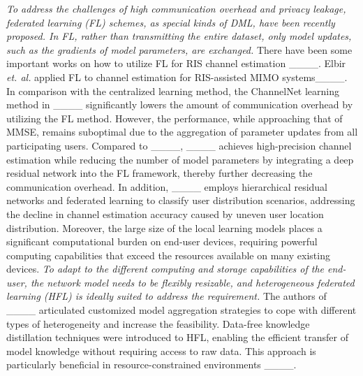 \emph{To address the challenges of high communication overhead and privacy leakage, federated learning (FL) schemes, as special kinds of DML, have been recently proposed. In FL, rather than transmitting the entire dataset, only model updates, such as the gradients of model parameters, are exchanged.} There have been some important works on how to utilize FL for RIS channel estimation ____. Elbir \textit{et. al.} applied FL to channel estimation for RIS-assisted MIMO systems____. In comparison with  the centralized learning method, the ChannelNet learning method in ____ significantly lowers the  amount of communication overhead by utilizing the FL method. However, the performance, while approaching that of MMSE, remains suboptimal due to the aggregation of parameter updates from all participating users. Compared to ____, ____ achieves high-precision channel estimation while reducing the number of model parameters by integrating a deep residual network into the FL framework, thereby further decreasing the communication overhead. 
In addition, ____ employs hierarchical residual networks and federated learning to classify user distribution scenarios, addressing the decline in channel estimation accuracy caused by uneven user location distribution.
Moreover, the large size of the local learning models places a significant computational burden on end-user devices, requiring powerful computing capabilities that exceed the resources available on many existing devices. \emph{To adapt to the different computing and storage capabilities of the end-user, the network model needs to be flexibly resizable, and heterogeneous federated learning (HFL) is ideally suited to address the requirement.} The authors of ____ articulated customized model aggregation strategies to cope with different types of heterogeneity and  increase the feasibility. Data-free knowledge distillation techniques were introduced to HFL, enabling the efficient transfer of model knowledge without requiring access to raw data. This approach is particularly beneficial in resource-constrained environments  ____.

